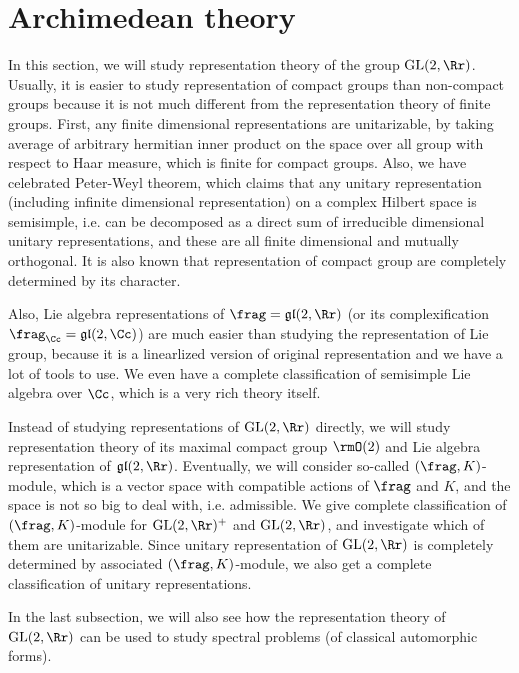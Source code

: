 \newpage

\section{Archimedean theory}
In this section, we will study representation theory of the group $\GL(2, \Rr)$. 
Usually, it is easier to study representation of compact groups than non-compact groups because it is not much different from the representation theory of finite groups. First, any finite dimensional representations are unitarizable, by taking average of arbitrary hermitian inner product on the space over all group with respect to Haar measure, which is finite for compact groups. Also, we have celebrated Peter-Weyl theorem, which claims that any unitary representation (including infinite dimensional representation) on a complex Hilbert space is semisimple, i.e. can be decomposed as a direct sum of irreducible dimensional unitary representations, and these are all finite dimensional and mutually orthogonal. 
It is also known that representation of compact group are completely determined by its character. 

Also, Lie algebra representations of $\frag = \mathfrak{gl}(2, \Rr)$ (or its complexification $\frag_{\Cc} = \mathfrak{gl}(2, \Cc)$) are much easier than studying the representation of Lie group, because it is a linearlized version of original representation and we have a lot of tools to use. We even have a complete classification of semisimple Lie algebra over $\Cc$, which is a very rich theory itself. 

Instead of studying representations of $\GL(2, \Rr)$ directly, we will study representation theory of its maximal compact group $\rmO(2)$ and Lie algebra representation of $\mathfrak{gl}(2,\Rr)$. Eventually, we  will consider so-called $(\frag, K)$-module, which is a vector space with compatible actions of $\frag$ and $K$, and the space is not so big to deal with, i.e. admissible. 
We give complete classification of $(\frag, K)$-module for $\GL(2, \Rr)^{+}$ and $\GL(2, \Rr)$, and investigate which of them are unitarizable. 
Since unitary representation of $\GL(2, \Rr)$ is completely determined by associated $(\frag, K)$-module, we also get a complete classification of unitary representations. 

In the last subsection, we will also see how the representation theory of $\GL(2, \Rr)$ can be used to study spectral problems (of classical automorphic forms). 




